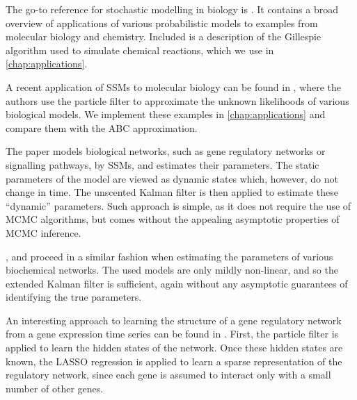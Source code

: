 The go-to reference for stochastic modelling in biology is \cite{wilkinson-book}. It contains a broad overview of applications of various probabilistic models to examples from molecular biology and chemistry. Included is a description of the Gillespie algorithm \cite{gillespie1, gillespie2} used to simulate chemical reactions, which we use in \autoref{chap:applications}.

A recent application of SSMs to molecular biology can be found in \cite{wilkinson}, where the authors use the particle filter to approximate the unknown likelihoods of various biological models. We implement these examples in \autoref{chap:applications} and compare them with the ABC approximation.

The paper \cite{bio1} models biological networks, such as gene regulatory networks or signalling pathways, by SSMs, and estimates their parameters. The static parameters of the model are viewed as dynamic states which, however, do not change in time. The unscented Kalman filter is then applied to estimate these ``dynamic'' parameters. Such approach is simple, as it does not require the use of MCMC algorithms, but comes without the appealing asymptotic properties of MCMC inference.

\cite{bio2}, \cite{bio3} and \cite{bio4} proceed in a similar fashion when estimating the parameters of various biochemical networks. The used models are only mildly non-linear, and so the extended Kalman filter is sufficient, again without any asymptotic guarantees of identifying the true parameters.

An interesting approach to learning the structure of a gene regulatory network from a gene expression time series can be found in \cite{bio5}. First, the particle filter is applied to learn the hidden states of the network. Once these hidden states are known, the LASSO regression is applied to learn a sparse representation of the regulatory network, since each gene is assumed to interact only with a small number of other genes.